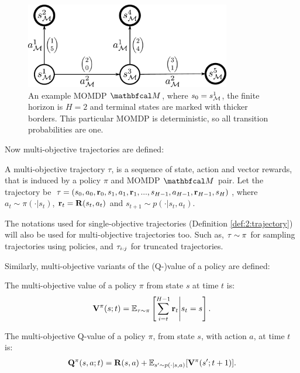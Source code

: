     \begin{figure}
        \centering\includegraphics[width=0.8\textwidth]{figures/ch2/example_momdp.pdf} 
        \caption[An example MOMDP $\bfcl{M}$.]{An example MOMDP $\bfcl{M}$, where $s_0=s_{\mathcal{M}}^1$, the finite horizon is $H=2$ and terminal states are marked with thicker borders. This particular MOMDP is deterministic, so all transition probabilities are one.}
        \label{fig:2:momdp_eg}
    \end{figure}

    Now multi-objective trajectories are defined:
    \begin{defn}
        \label{def:2:mo_trajectory}
        A \textnormal{multi-objective trajectory} $\tau$, is a sequence of state, action and vector rewards, that is induced by a policy $\pi$ and MOMDP $\bfcl{M}$ pair. Let the trajectory be $\mathbf{\tau} = (s_0, a_0, \mathbf{r}_0, s_1, a_1, \mathbf{r}_1, ..., s_{H-1}, a_{H-1}, \mathbf{r}_{H-1}, s_H)$, where $a_t \sim \pi(\cdot|s_t)$, $\mathbf{r}_t=\mathbf{R}(s_t,a_t)$ and $s_{t+1} \sim p(\cdot|s_t,a_t)$. 
        
        The notations used for single-objective trajectories (Definition \ref{def:2:trajectory}) will also be used for multi-objective trajectories too. Such as, $\mathbf{\tau}\sim\pi$ for sampling trajectories using policies, and $\mathbf{\tau}_{i:j}$ for truncated trajectories.
    \end{defn}

    Similarly, multi-objective variants of the (Q-)value of a policy are defined:    
    \begin{defn}
        \label{def:2:mo_value}
        \label{def:2:mo_q_value}
        The \textnormal{multi-objective value} of a policy $\pi$ from state $s$ at time $t$ is:
        \begin{align}
            \mathbf{V}^{\pi}(s;t) = \mathbb{E}_{\mathbf{\tau}\sim\pi}\left[\sum_{i=t}^{H-1} \mathbf{r}_t \Bigg| s_t=s \right]. \label{eq:2:mo_value_fn_def}
        \end{align} 

        The \textnormal{multi-objective Q-value} of a policy $\pi$, from state $s$, with action $a$, at time $t$ is:
        \begin{align}
            \mathbf{Q}^{\pi}(s,a;t) = \mathbf{R}(s,a) + \mathbb{E}_{s'\sim p(\cdot|s,a)} [\mathbf{V}^{\pi}(s';t+1)]. \label{eq:2:mo_q_value_fn_def}
        \end{align} 
    \end{defn}

